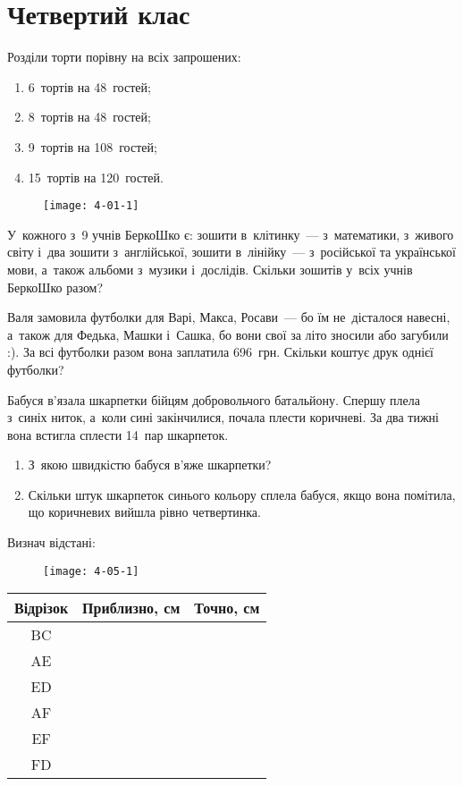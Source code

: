 \chapter{Четвертий клас}

\problem
Розділи торти порівну на всіх запрошених:
\begin{enumerate}
    \item 6~тортів на 48~гостей;
    \item 8~тортів на 48~гостей;
    \item 9~тортів на 108~гостей;
    \item 15~тортів на 120~гостей.
\end{enumerate}

\begin{figure}[h]
    \centering
    \texttt{[image: 4-01-1]}
\end{figure}


\problem
У~кожного з~9 учнів БеркоШко є: зошити в~клітинку~--- з~математики,
з~живого світу і~два зошити з~англійської, зошити в~лінійку~---
з~російської та української мови, а~також альбоми з~музики і~дослідів.
Скільки зошитів у~всіх учнів БеркоШко разом?


\problem
Валя замовила футболки для Варі, Макса, Росави~--- бо їм не~дісталося навесні,
а~також для Федька, Машки і~Сашка, бо вони свої за літо зносили або загубили :).
За всі футболки разом вона заплатила 696~грн.
Скільки коштує друк однієї футболки? 


\problem
Бабуся в’язала шкарпетки бійцям добровольчого батальйону.
Спершу плела з~синіх ниток, а~коли сині закінчилися, почала плести коричневі.
За два тижні вона встигла сплести 14~пар шкарпеток.
\begin{enumerate}
    \item З~якою швидкістю бабуся в’яже шкарпетки? 
    \item Скільки штук шкарпеток синього кольору сплела бабуся,
    якщо вона помітила, що коричневих вийшла рівно четвертинка.
\end{enumerate}


\problem
Визнач відстані:

\begin{figure}[h]
    \centering
    \texttt{[image: 4-05-1]}
\end{figure}

\begin{tabular}{|c|c|c|}
    \hline
    Відрізок & Приблизно, см & Точно, см \\ \hline
    BC & & \\ \hline
    AE & & \\ \hline
    ED & & \\ \hline
    AF & & \\ \hline
    EF & & \\ \hline
    FD & & \\ \hline
\end{tabular}


